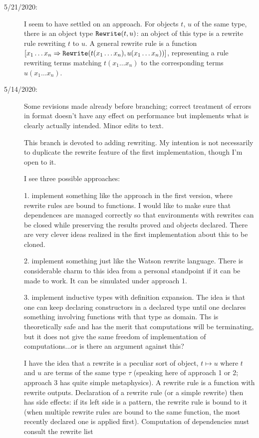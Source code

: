 \documentclass[12pt]{article}
\begin{document}
\begin{description}
\item[5/21/2020:]  I seem to have settled on an approach.  For objects $t$, $u$ of the same type, there is an object type ${\tt Rewrite}(t,u)$:  an object of this
type is a rewrite rule rewriting $t$ to $u$.  A general rewrite rule is a function $[x_1 \ldots x_n \Rightarrow {\tt Rewrite}(t(x_1\ldots x_n),u(x_1\ldots x_n))]$, representing
a rule rewriting terms matching $t(x_1\ldots x_n)$ to the corresponding terms $u(x_1\ldots x_n)$.

\item[5/14/2020:]  Some revisions made already before branching;  correct treatment of errors in format doesn't have any effect on performance
but implements what is clearly actually intended.  Minor edits to text.

This branch is devoted to adding rewriting.  My intention is not necessarily to duplicate the rewrite feature of the first implementation, though I'm open to it.

I see three possible approaches:

1.  implement something like the approach in the first version, where rewrite rules are bound to functions.  I would like to make sure that dependences
are managed correctly so that environments with rewrites can be closed while preserving the results proved and objects declared.  There are very clever
ideas realized in the first implementation about this to be cloned.

2.  implement something just like the Watson rewrite language.  There is considerable charm to this idea from a personal standpoint if it can be made to work.  It can
be simulated under approach 1.

3.  implement inductive types with definition expansion.  The idea is that one can keep declaring constructors in a declared type until one declares something involving
functions with that type as domain.  Ths is theoretically safe and has the merit that computations will be terminating, but it does not give the same freedom of implementation
of computations...or is there an argument against this?

I have the idea that a rewrite is a peculiar sort of object, $t \mapsto u$ where $t$ and $u$ are terms of the same type $\tau$ (speaking here of approach 1 or 2;
approach 3  has quite simple metaphysics).  A rewrite rule is a function with rewrite outputs.  Declaration of a rewrite rule (or a simple rewrite) then has side effects:
if its left side is a pattern, the rewrite rule is bound to it (when multiple rewrite rules are bound to the same function, the most recently declared one is applied first).
Computation of dependencies must consult the rewrite list


\end{description}
\end{document}
